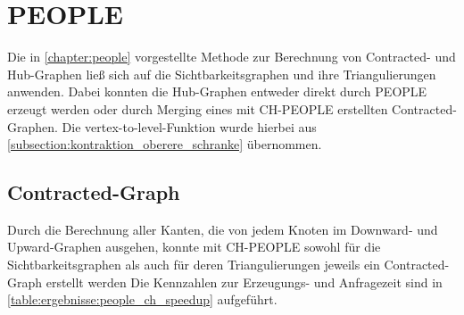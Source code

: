 \section{PEOPLE}

Die in \autoref{chapter:people} vorgestellte Methode zur Berechnung von Contracted- und Hub-Graphen ließ sich auf die Sichtbarkeitsgraphen und ihre Triangulierungen anwenden.
Dabei konnten die Hub-Graphen entweder direkt durch PEOPLE erzeugt werden oder durch Merging eines mit CH-PEOPLE erstellten Contracted-Graphen.
Die vertex-to-level-Funktion wurde hierbei aus \autoref{subsection:kontraktion_oberere_schranke} übernommen.

\subsection{Contracted-Graph}

Durch die Berechnung aller Kanten, die von jedem Knoten im Downward- und Upward-Graphen ausgehen, konnte mit CH-PEOPLE sowohl für die Sichtbarkeitsgraphen als auch für deren Triangulierungen jeweils ein Contracted-Graph erstellt werden
Die Kennzahlen zur Erzeugungs- und Anfragezeit sind in \autoref{table:ergebnisse:people_ch_speedup} aufgeführt.

